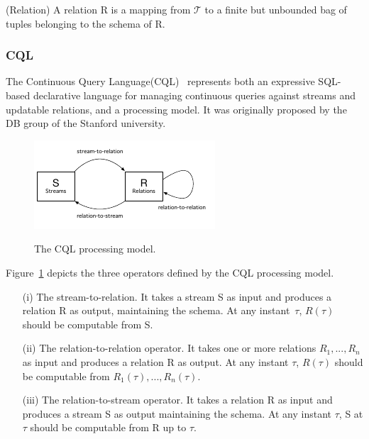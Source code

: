 \begin{Definition}
(Relation) A relation R is a mapping from $\mathcal{T}$ to a finite but unbounded bag of tuples belonging to the schema of R.
\end{Definition}
 
\subsubsection{CQL}\label{sec:CQL}
The Continuous Query Language(CQL)~\cite{arasu2006cql} represents both an expressive SQL-based declarative language for managing continuous queries against streams and updatable relations, and a processing model. 
It was originally proposed by the DB group of the Stanford university.

\begin{figure}[t]
  \begin{center}
    \includegraphics[width=.65\textwidth]{img/cql-model}\\
    \caption{The CQL processing model.}
    \label{fig:cql-model}
  \end{center}
\end{figure}

Figure~\ref{fig:cql-model} depicts the three operators defined by the CQL processing model. 
\begin{itemize}
\item[(i)] The stream-to-relation. It takes a stream S as input and produces a relation R as output, maintaining the schema. At any instant~$\tau$, $R(\tau)$ should be computable from S.
\item[(ii)] The relation-to-relation operator. It takes one or more relations $R_1,... , R_n$ as input and produces a relation R as output. At any instant $\tau$, $R(\tau)$ should be computable from $R_1(\tau),... , R_n(\tau)$.
\item[(iii)] The relation-to-stream operator. It takes a relation R as input and produces a stream S as output maintaining the schema. At any instant $\tau$, S at $\tau$ should be computable from R up to $\tau$.
\end{itemize}

